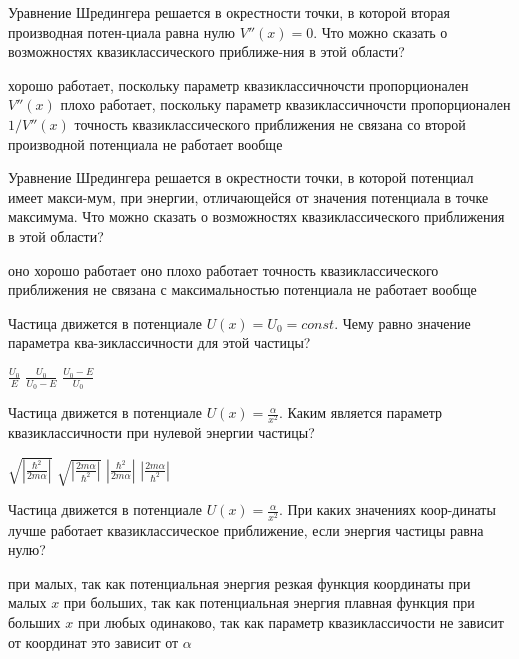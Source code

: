 \documentclass[11pt,a4paper]{exam}
\begin{document}
\begin{questions}
\question Уравнение Шредингера решается в окрестности точки, в которой вторая производная потен-циала равна нулю $V''(x) = 0$. Что можно сказать о возможностях квазиклассического приближе-ния в этой области?
\begin{choices}
\choice хорошо работает, поскольку параметр квазиклассичночсти пропорционален $V''(x)$
\choice плохо работает, поскольку параметр квазиклассичночсти пропорционален $1/V''(x)$
\choice точность квазиклассического приближения не связана со второй производной потенциала
\choice не работает вообще
\end{choices}

\question Уравнение Шредингера решается в окрестности точки, в которой потенциал имеет макси-мум, при энергии, отличающейся от значения потенциала в точке максимума. Что можно сказать о возможностях квазиклассического приближения в этой области?
\begin{choices}
\choice оно хорошо работает
\choice оно плохо работает
\choice точность квазиклассического приближения не связана с максимальностью потенциала  
\choice не работает вообще
\end{choices}

\question Частица движется в потенциале $U(x) = {U_0} = const$. Чему равно значение параметра ква-зиклассичности для этой частицы?
\begin{choices}
\choice $\frac{{{U_0}}}{E}$     
\choice $\frac{{{U_0}}}{{{U_0} - E}}$    
\choice $\frac{{{U_0} - E}}{{{U_0}}}$ 
\end{choices}

\question Частица движется в потенциале $U(x) = \frac{\alpha }{{{x^2}}}$. Каким является параметр квазиклассичности при нулевой энергии частицы?
\begin{choices}
\choice $\sqrt {\left| {\frac{{{\hbar ^2}}}{{2m\alpha }}} \right|} $      
\choice $\sqrt {\left| {\frac{{2m\alpha }}{{{\hbar ^2}}}} \right|} $      
\choice $\left| {\frac{{{\hbar ^2}}}{{2m\alpha }}} \right|$      
\choice $\left| {\frac{{2m\alpha }}{{{\hbar ^2}}}} \right|$
\end{choices}

\question Частица движется в потенциале $U(x) = \frac{\alpha }{{{x^2}}}$. При каких значениях коор-динаты лучше работает квазиклассическое приближение, если энергия частицы равна нулю?
\begin{choices}
\choice при малых, так как потенциальная энергия резкая функция координаты при малых $x$
\choice при больших, так как потенциальная энергия плавная функция при больших $x$
\choice при любых одинаково, так как параметр квазиклассичости не зависит от координат
\choice это зависит от $\alpha $
\end{choices}


\end{questions}
\end{document}

